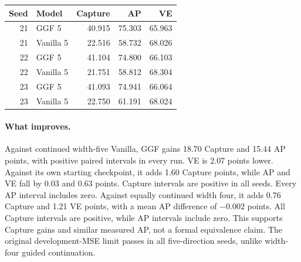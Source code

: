 \begin{agfresulttable}
\caption{Five-direction ordinary continuation and its matched Vanilla control:
test percentages by seed. All six pass the original development-MSE limit.}
\label{tab:continuation5-seeds}
\begin{tabular}{@{}rlrrr@{}}\hline
Seed & Model & Capture & AP & VE\\\hline
21 & GGF 5 &40.915&75.303&65.963\\
21 & Vanilla 5 &22.516&58.732&68.026\\
22 & GGF 5 &41.104&74.800&66.103\\
22 & Vanilla 5 &21.751&58.812&68.304\\
23 & GGF 5 &41.093&74.941&66.064\\
23 & Vanilla 5 &22.750&61.191&68.024\\\hline
\end{tabular}\end{agfresulttable}

\paragraph{What improves.}
Against continued width-five Vanilla, GGF gains 18.70 Capture and 15.44
AP points, with positive paired intervals in every run. VE is 2.07 points
lower. Against its own starting checkpoint, it adds 1.60 Capture points,
while AP and VE fall by 0.03 and 0.63 points. Capture intervals are positive
in all seeds. Every AP interval includes zero. Against equally continued
width four, it adds 0.76 Capture and 1.21 VE points, with a mean AP difference
of $-0.002$ points. All Capture intervals are positive, while AP intervals
include zero. This supports Capture gains and similar measured AP, not a
formal equivalence claim. The original development-MSE limit passes in all
five-direction seeds, unlike width-four guided continuation.

